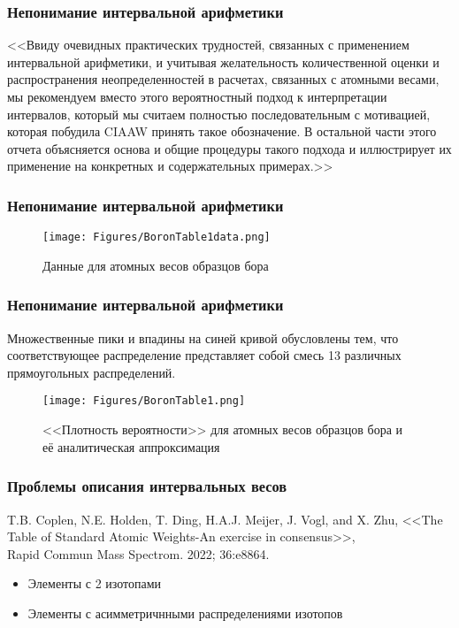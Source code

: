 \begin{frame}
	\frametitle{Непонимание интервальной арифметики}


	
<<Ввиду очевидных практических трудностей, связанных с применением интервальной арифметики, и учитывая
желательность количественной оценки и распространения неопределенностей в расчетах, связанных с атомными весами, мы рекомендуем
вместо этого вероятностный подход к интерпретации интервалов, который мы считаем полностью последовательным
с мотивацией, которая побудила CIAAW принять такое обозначение. 
\medskip
В остальной части этого отчета объясняется основа и
общие процедуры такого подхода и иллюстрирует их применение на конкретных и содержательных примерах.>>
	
\end{frame}


\begin{frame}
	\frametitle{Непонимание интервальной арифметики}
	
	\begin{figure}[ht] 
		\centering\small
		\unitlength=1mm
		\texttt{[image: Figures/BoronTable1data.png]}
		\caption{Данные для атомных весов образцов бора} 
		\label{f:BoronTable1data}
	\end{figure}	
	
	
\end{frame}

\begin{frame}
	\frametitle{Непонимание интервальной арифметики}
Множественные пики и впадины на синей кривой обусловлены тем, что соответствующее распределение представляет собой смесь 13 различных прямоугольных распределений.
\begin{figure}[ht] 
	\centering\small
	\unitlength=1mm
	\texttt{[image: Figures/BoronTable1.png]}
	\caption{<<Плотность вероятности>> для атомных весов образцов бора и её аналитическая аппроксимация} 
	\label{f:BoronTable1}
\end{figure}	
	
	
\end{frame}

\begin{frame}
\frametitle{Проблемы описания интервальных весов}
T.B. Coplen, N.E. Holden, T. Ding, H.A.J. Meijer, J. Vogl, and X. Zhu, <<The Table of Standard Atomic Weights-An exercise in consensus>>, \\ Rapid Commun Mass Spectrom. 2022; 36:e8864. %

\begin{itemize}
	\item Элементы с 2 изотопами
	\item Элементы с асимметричнными распределениями изотопов
\end{itemize}

\end{frame}

